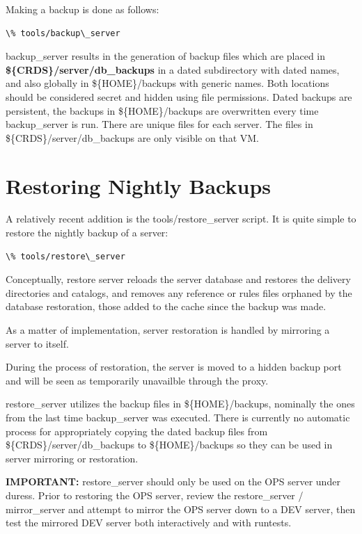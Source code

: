 \documentclass[letterpaper,10pt,english]{sphinxmanual}
\begin{document}
Making a backup is done as follows:

\begin{Verbatim}[commandchars=\\\{\}]
\% tools/backup\_server
\end{Verbatim}

backup\_server results in the generation of backup files which are placed in \textbf{\$\{CRDS\}/server/db\_backups} in a dated
subdirectory with dated names,  and also globally in \$\{HOME\}/backups with generic names.   Both locations should be
considered secret and hidden using file permissions.   Dated backups are persistent,  the backups in \$\{HOME\}/backups
are overwritten every time backup\_server is run.   There are unique files for each server.   The files in
\$\{CRDS\}/server/db\_backups are only visible on that VM.


\section{Restoring Nightly Backups}
\label{server_guide:restoring-nightly-backups}
A relatively recent addition is the tools/restore\_server script.   It is quite simple to restore the nightly backup
of a server:

\begin{Verbatim}[commandchars=\\\{\}]
\% tools/restore\_server
\end{Verbatim}

Conceptually,  restore server reloads the server database and restores the delivery directories and catalogs,  and
removes any reference or rules files orphaned by the database restoration,  those added to the cache since the backup
was made.

As a matter of implementation,  server restoration is handled by mirroring a server to itself.

During the process of restoration,  the server is moved to a hidden backup port and will be seen as temporarily
unavailble through the proxy.

restore\_server utilizes the backup files in \$\{HOME\}/backups,  nominally the ones from the last time backup\_server was
executed.   There is currently no automatic process for appropriately copying the dated backup files from
\$\{CRDS\}/server/db\_backups to \$\{HOME\}/backups so they can be used in server mirroring or restoration.

\textbf{IMPORTANT:}  restore\_server should only be used on the OPS server under duress.   Prior to restoring the OPS server,
review the restore\_server / mirror\_server and attempt to mirror the OPS server down to a DEV server,  then test the
mirrored DEV server both interactively and with runtests.
\end{document}
